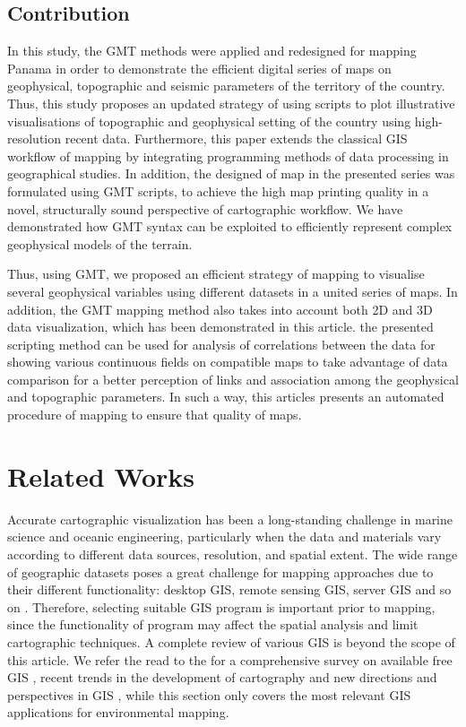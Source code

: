\documentclass[USenglish,twocolumn]{article}
\begin{document}
\subsection{Contribution}
In this study, the GMT methods were applied and redesigned for mapping Panama in order to demonstrate the efficient digital series of maps on geophysical, topographic and seismic parameters of the territory of the country. Thus, this study proposes an updated strategy of using scripts to plot illustrative visualisations of topographic and geophysical setting of the country using high-resolution recent data. Furthermore, this paper extends the classical GIS workflow of mapping by integrating programming methods of data processing in geographical studies. In addition, the designed of map in the presented series was formulated using GMT scripts, to achieve the high map printing quality in a novel, structurally sound perspective of cartographic workflow. We have demonstrated how GMT syntax can be exploited to efficiently represent complex geophysical models of the terrain. 

Thus, using GMT, we proposed an efficient strategy of mapping to visualise several geophysical variables using different datasets in a united series of maps. In addition, the GMT mapping method also takes into account both 2D and 3D data visualization, which has been demonstrated in this article. the presented scripting method can be used for analysis of correlations between the data for showing various continuous fields on compatible maps to take advantage of data comparison for a better perception of links and association among the geophysical and topographic parameters. In such a way, this articles presents an automated procedure of mapping to ensure that quality of maps.

\section{Related Works}
Accurate cartographic visualization has been a long-standing challenge in marine science and oceanic engineering, particularly when the data and materials vary according to different data sources, resolution, and spatial extent. The wide range of geographic datasets poses a great challenge for mapping approaches due to their different functionality: desktop GIS, remote sensing GIS, server GIS and so on \citep{STEINIGER2013136}. Therefore, selecting suitable GIS program is important prior to mapping, since the functionality of program may affect the spatial analysis and limit cartographic techniques. A complete review of various GIS is beyond the scope of this article. We refer the read to the for a comprehensive survey on available free GIS \citep{LEIDIG201549,CHEN2010253}, recent trends in the development of cartography \citep{WangFu} and new directions and perspectives in GIS \citep{Lietal2022,DUBE2022661}, while this section only covers the most relevant GIS applications for environmental mapping.
\end{document}
